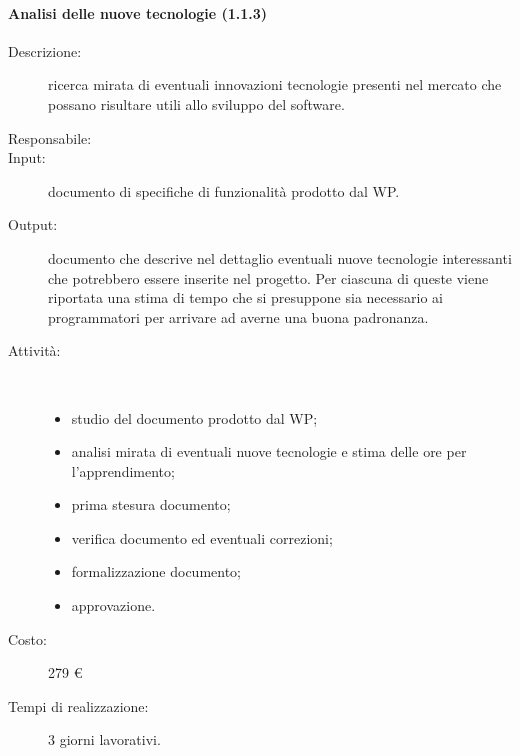 \paragraph{Analisi delle nuove tecnologie (1.1.3)}
\begin{description}
\item[Descrizione:] ricerca mirata di eventuali innovazioni tecnologie presenti nel mercato che possano risultare utili allo sviluppo del software.
\item[Responsabile:]
\item[Input:] documento di specifiche di funzionalit\`{a} prodotto dal WP.
\item[Output:] documento che descrive nel dettaglio eventuali nuove tecnologie interessanti che potrebbero essere inserite nel progetto. Per ciascuna di queste viene riportata una stima di tempo che si presuppone sia necessario ai programmatori per arrivare ad averne una buona padronanza.
\item[Attività:]\mbox{}\\[-1.5\baselineskip]
	\begin{itemize}
	\item studio del documento prodotto dal WP;
	\item analisi mirata di eventuali nuove tecnologie e stima delle ore per l'apprendimento;
	\item prima stesura documento;
	\item verifica documento ed eventuali correzioni;
	\item formalizzazione documento;
	\item approvazione.
	\end{itemize}
\item[Costo:] 279 \euro{}
\item[Tempi di realizzazione:] 3 giorni lavorativi.
\end{description}


